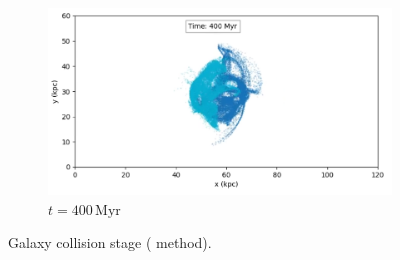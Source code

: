 \begin{figure}[H]
    \begin{subfigure}[b]{0.8\textwidth}
        \centering
        \includegraphics[width=\textwidth]{chapters/results/img/p3m-collision/400myr.png}
        \caption{$t=400\,\text{Myr}$}
        \label{fig:collision-p3m-sub3}
    \end{subfigure}

    \caption{Galaxy collision stage (\PThreeM{} method).}
    \label{fig:collision-p3m}
\end{figure}

